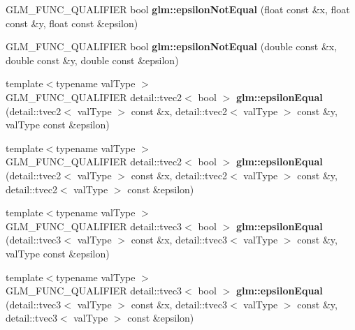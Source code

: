 \begin{DoxyCompactItemize}
\item 
\hypertarget{namespaceglm_ad109ef08ab83eca25da51ca138a0a2f1}{}G\+L\+M\+\_\+\+F\+U\+N\+C\+\_\+\+Q\+U\+A\+L\+I\+F\+I\+E\+R bool {\bfseries glm\+::epsilon\+Not\+Equal} (float const \&x, float const \&y, float const \&epsilon)\label{namespaceglm_ad109ef08ab83eca25da51ca138a0a2f1}

\item 
\hypertarget{namespaceglm_a5d57149702e714db5701596a5f8bf52b}{}G\+L\+M\+\_\+\+F\+U\+N\+C\+\_\+\+Q\+U\+A\+L\+I\+F\+I\+E\+R bool {\bfseries glm\+::epsilon\+Not\+Equal} (double const \&x, double const \&y, double const \&epsilon)\label{namespaceglm_a5d57149702e714db5701596a5f8bf52b}

\item 
\hypertarget{namespaceglm_a4a3e2eea11263ad308ccb17a0cc53a67}{}{\footnotesize template$<$typename val\+Type $>$ }\\G\+L\+M\+\_\+\+F\+U\+N\+C\+\_\+\+Q\+U\+A\+L\+I\+F\+I\+E\+R detail\+::tvec2$<$ bool $>$ {\bfseries glm\+::epsilon\+Equal} (detail\+::tvec2$<$ val\+Type $>$ const \&x, detail\+::tvec2$<$ val\+Type $>$ const \&y, val\+Type const \&epsilon)\label{namespaceglm_a4a3e2eea11263ad308ccb17a0cc53a67}

\item 
\hypertarget{namespaceglm_a27de46979269a3aa50277e362522e064}{}{\footnotesize template$<$typename val\+Type $>$ }\\G\+L\+M\+\_\+\+F\+U\+N\+C\+\_\+\+Q\+U\+A\+L\+I\+F\+I\+E\+R detail\+::tvec2$<$ bool $>$ {\bfseries glm\+::epsilon\+Equal} (detail\+::tvec2$<$ val\+Type $>$ const \&x, detail\+::tvec2$<$ val\+Type $>$ const \&y, detail\+::tvec2$<$ val\+Type $>$ const \&epsilon)\label{namespaceglm_a27de46979269a3aa50277e362522e064}

\item 
\hypertarget{namespaceglm_aa846c072e75cbec839b1b1ffbf098508}{}{\footnotesize template$<$typename val\+Type $>$ }\\G\+L\+M\+\_\+\+F\+U\+N\+C\+\_\+\+Q\+U\+A\+L\+I\+F\+I\+E\+R detail\+::tvec3$<$ bool $>$ {\bfseries glm\+::epsilon\+Equal} (detail\+::tvec3$<$ val\+Type $>$ const \&x, detail\+::tvec3$<$ val\+Type $>$ const \&y, val\+Type const \&epsilon)\label{namespaceglm_aa846c072e75cbec839b1b1ffbf098508}

\item 
\hypertarget{namespaceglm_a2323f3eadd280b05f8f2e37aad9cdb83}{}{\footnotesize template$<$typename val\+Type $>$ }\\G\+L\+M\+\_\+\+F\+U\+N\+C\+\_\+\+Q\+U\+A\+L\+I\+F\+I\+E\+R detail\+::tvec3$<$ bool $>$ {\bfseries glm\+::epsilon\+Equal} (detail\+::tvec3$<$ val\+Type $>$ const \&x, detail\+::tvec3$<$ val\+Type $>$ const \&y, detail\+::tvec3$<$ val\+Type $>$ const \&epsilon)\label{namespaceglm_a2323f3eadd280b05f8f2e37aad9cdb83}


\end{DoxyCompactItemize}
